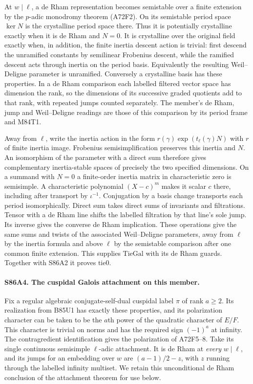 At $w\mid\ell$, a de Rham representation becomes semistable over
a finite extension by the $p$-adic monodromy theorem (A72F2).
On its semistable period space $\ker N$ is the crystalline period
space there. Thus it is potentially crystalline exactly when it is
de Rham and $N=0$. It is crystalline over the original field exactly
when, in addition, the finite inertia descent action is trivial:
first descend the unramified constants by semilinear Frobenius
descent, while the ramified descent acts through inertia on the
period basis. Equivalently the resulting Weil--Deligne parameter is
unramified. Conversely a crystalline basis has these properties.
In a de Rham comparison each labelled filtered vector space has
dimension the rank, so the dimensions of its successive graded
quotients add to that rank, with repeated jumps counted separately.
The member's de Rham, jump and Weil--Deligne readings are those of
this comparison by its period frame and M84T1.

Away from $\ell$, write the inertia action in the form
$r(\gamma)\exp(t_\ell(\gamma)N)$ with $r$ of finite inertia
image. Frobenius semisimplification preserves this inertia and $N$.
An isomorphism of the parameter with a direct sum therefore gives
complementary inertia-stable spaces of precisely the two specified
dimensions. On a summand with $N=0$ a finite-order inertia matrix
in characteristic zero is semisimple. A characteristic polynomial
$(X-c)^m$ makes it scalar $c$ there, including after transport by
$\iota^{-1}$. Conjugation by a basis change transports each period
isomorphically. Direct sum takes direct sums of invariants and
filtrations. Tensor with a de Rham line shifts the labelled
filtration by that line's sole jump. Its inverse gives the converse
de Rham implication. These operations give the same sums and twists
of the associated Weil--Deligne parameters, away from $\ell$ by the
inertia formula and above $\ell$ by the semistable comparison after
one common finite extension. This supplies $\mathrm{TieGal}$ with its
de Rham guards. Together with S86A2 it proves $\mathrm{tie0}$.

\paragraph{S86A4. The cuspidal Galois attachment on this member.}
Fix a regular algebraic conjugate-self-dual cuspidal label $\pi$ of
rank $a\ge2$. Its realization from B85U1 has exactly these
properties, and its polarization character can be taken to be the
$a$th power of the quadratic character of $E/F$. This character is
trivial on norms and has the required sign $(-1)^a$ at infinity.
The contragredient identification gives the polarization of A72F5--8.
Take its single continuous semisimple $\ell$-adic attachment. It is
de Rham at \emph{every} $w\mid\ell$, and its jumps for an embedding
over $w$ are $(a-1)/2-z$, with $z$ running through the labelled
infinity multiset. We retain this unconditional de Rham conclusion
of the attachment theorem for use below.

